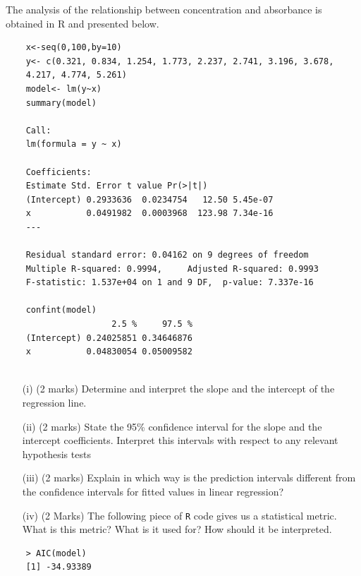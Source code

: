 \documentclass[a4paper,12pt]{article}
\begin{document}
The analysis of the relationship between concentration and absorbance is obtained in R and presented below. 
\begin{framed}
	\begin{verbatim}
	x<-seq(0,100,by=10)
	y<- c(0.321, 0.834, 1.254, 1.773, 2.237, 2.741, 3.196, 3.678, 
	4.217, 4.774, 5.261)
	model<- lm(y~x)
	summary(model)
	
	Call:
	lm(formula = y ~ x)
	
	Coefficients:
	Estimate Std. Error t value Pr(>|t|)    
	(Intercept) 0.2933636  0.0234754   12.50 5.45e-07 
	x           0.0491982  0.0003968  123.98 7.34e-16 
	---
	
	Residual standard error: 0.04162 on 9 degrees of freedom
	Multiple R-squared: 0.9994,     Adjusted R-squared: 0.9993 
	F-statistic: 1.537e+04 on 1 and 9 DF,  p-value: 7.337e-16 
	
	confint(model)
	                 2.5 %     97.5 %
	(Intercept) 0.24025851 0.34646876
	x           0.04830054 0.05009582
	
	\end{verbatim}
\end{framed}

\begin{itemize}
	\item[(i)] (2 marks)
	Determine and interpret the slope and the intercept of the regression line.
	\item[(ii)]  (2 marks) State the 95\% confidence interval for the slope and the intercept coefficients. Interpret this intervals with respect to any relevant hypothesis tests
	\item[(iii)] (2 marks) Explain in which way is the prediction intervals different from the confidence intervals for fitted values in linear regression?
	\item[(iv)] (2 Marks) The following piece of \texttt{R} code gives us a statistical metric. What is this metric? What is it used for? How should it be interpreted.
	
\end{itemize}
\begin{framed}
	\begin{verbatim}
	> AIC(model)
	[1] -34.93389	
	\end{verbatim}
\end{framed}




\end{document}
